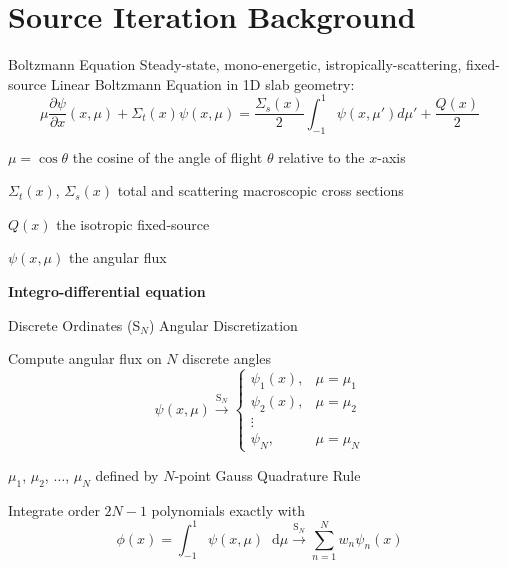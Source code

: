 \documentclass[10pt]{beamer}
\newcommand{\SN}{S$_N$\xspace}
\newcommand{\ud}{\mathop{}\!\mathrm{d}} %
\newcommand{\pderiv}[2]{\frac{\partial #1}{\partial #2}}
\begin{document}
\section{Source Iteration Background}

\begin{frame}{Boltzmann Equation}
    Steady-state, mono-energetic, istropically-scattering, fixed-source Linear Boltzmann Equation in 1D slab geometry:
    \begin{equation*}
        \mu \pderiv{\psi}{x}(x, \mu) + \Sigma_t(x) \psi(x,\mu) = 
        \frac{\Sigma_s(x)}{2} \int_{-1}^{1} \psi(x, \mu') d\mu' + \frac{Q(x)}{2}
    \end{equation*}

    $\mu = \cos \theta$ the cosine of the angle of flight $\theta$ relative to the $x$-axis

    $\Sigma_t(x)$, $\Sigma_s(x)$ total and scattering macroscopic cross sections 

    $Q(x)$ the isotropic fixed-source

    $\psi(x,\mu)$ the angular flux 


    \vfill
    \centerline{\textbf{Integro-differential equation}}

\end{frame}

\begin{frame}{Discrete Ordinates (\SN) Angular Discretization}

    Compute angular flux on $N$ discrete angles
    \begin{equation*}
        \psi(x,\mu) \xrightarrow{\text{S}_N} 
        \begin{cases}
            \psi_1(x), & \mu = \mu_1 \\ 
            \psi_2(x), & \mu = \mu_2 \\ 
            \vdots \\ 
            \psi_N, & \mu = \mu_N 
        \end{cases}
    \end{equation*}

    $\mu_1$, $\mu_2$, $\dots$, $\mu_N$ defined by $N$-point Gauss Quadrature Rule 

    Integrate order $2N-1$ polynomials exactly with 
    \begin{equation*}
        \phi(x) = \int_{-1}^1 \psi(x, \mu) \ud\mu 
            \xrightarrow{\text{S}_N} \sum_{n=1}^N 
            w_n \psi_n(x)
    \end{equation*}

\end{frame}
\end{document}

